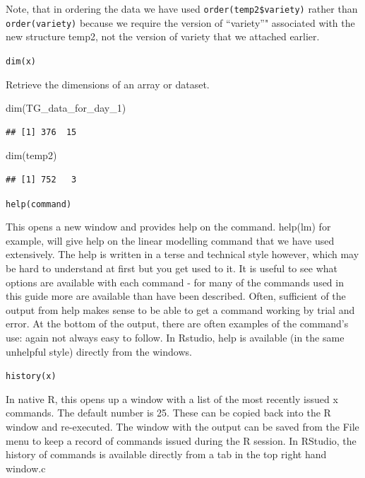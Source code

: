 \documentclass[
]{book}
\newenvironment{Shaded}{\begin{snugshade}}{\end{snugshade}}
\newcommand{\FunctionTok}[1]{\textcolor[rgb]{0.00,0.00,0.00}{#1}}
\newcommand{\NormalTok}[1]{#1}
\begin{document}
Note, that in ordering the data we have used \texttt{order(temp2\$variety)} rather than \texttt{order(variety)} because we require the version of ``variety''" associated with the new structure temp2, not the version of variety that we attached earlier.

\texttt{dim(x)}

Retrieve the dimensions of an array or dataset.

\begin{Shaded}
\begin{Highlighting}[]
\FunctionTok{dim}\NormalTok{(TG\_data\_for\_day\_1)}
\end{Highlighting}
\end{Shaded}

\begin{verbatim}
## [1] 376  15
\end{verbatim}

\begin{Shaded}
\begin{Highlighting}[]
\FunctionTok{dim}\NormalTok{(temp2)}
\end{Highlighting}
\end{Shaded}

\begin{verbatim}
## [1] 752   3
\end{verbatim}

\texttt{help(command)}

This opens a new window and provides help on the command. help(lm) for example, will give help on the linear modelling command that we have used extensively. The help is written in a terse and technical style however, which may be hard to understand at first but you get used to it. It is useful to see what options are available with each command - for many of the commands used in this guide more are available than have been described. Often, sufficient of the output from help makes sense to be able to get a command working by trial and error. At the bottom of the output, there are often examples of the command's use: again not always easy to follow. In Rstudio, help is available (in the same unhelpful style) directly from the windows.

\texttt{history(x)}

In native R, this opens up a window with a list of the most recently issued x commands. The default number is 25. These can be copied back into the R window and re-executed. The window with the output can be saved from the File menu to keep a record of commands issued during the R session. In RStudio, the history of commands is available directly from a tab in the top right hand window.c
\end{document}

